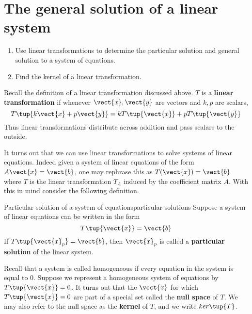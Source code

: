 \section{The general solution of a linear system}

\begin{outcome}
  \begin{enumerate}
  \item Use linear transformations to determine the particular
    solution and general solution to a system of equations.
  \item Find the kernel of a linear transformation.
  \end{enumerate}
\end{outcome}

Recall the definition of a linear transformation discussed above. 
$T$ is a \textbf{linear transformation} if whenever $\vect{x}, \vect{y}$ are
vectors and $k,p$ are scalars,
\begin{equation*}
T\tup{k\vect{x}+p\vect{y}} =k T \tup{\vect{x} } +p T\tup{\vect{y} }
\end{equation*}
Thus linear transformations distribute across addition and pass scalars to
the outside.

It turns out that we can use linear transformations to solve
systems of linear equations. Indeed given a system of linear equations of the
form $A\vect{x}=\vect{b}$, one may rephrase this as $T(\vect{x})=\vect{b}$ where $T$ is the linear
transformation $T_A$ induced by the coefficient matrix $A$. With this in mind consider the following definition. 

\begin{definition}{Particular solution of a system of equations}{particular-solutions}
Suppose a system of linear equations can be written in the form
\begin{equation*}
T\tup{\vect{x}}=\vect{b}
\end{equation*}
If $T\tup{\vect{x}_{p}}=\vect{b}$, 
then $\vect{x}_{p}$ is called a \textbf{particular solution} of
the linear system.
\end{definition}

Recall that a system is called homogeneous if every equation in the system is equal to $0$. 
Suppose we represent a homogeneous system of equations by $T\tup{\vect{x}}=0$. It turns out
that the $\vect{x}$ for which $T \tup{\vect{x}} = 0$ are part of a special set called the \textbf{null space}
of $T$. We may also refer to the null space as the \textbf{kernel} of $T$, and we write $ker\tup{T}$. 


